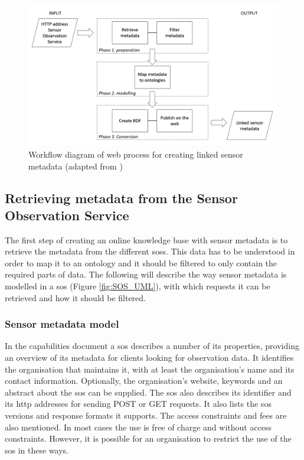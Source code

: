 \begin{figure}
	\centering
	\includegraphics[width=1\linewidth]{UML/wps1workflow.PNG}
	\caption{Workflow diagram of web process for creating linked sensor metadata (adapted from \cite{LD:Missier})}
	\label{fig:WPS1workflow}
\end{figure}

\subsection{Retrieving metadata from the Sensor Observation Service}
\label{chap:retrieveSOS}

The first step of creating an online knowledge base with sensor metadata is to retrieve the metadata from the different \aclp{sos}. This data has to be understood in order to map it to an ontology and it should be filtered to only contain the required parts of data. The following will describe the way sensor metadata is modelled in a \ac{sos} (Figure \ref{fig:SOS_UML}), with which requests it can be retrieved and how it should be filtered. 

\subsubsection{Sensor metadata model}
In the capabilities document a \ac{sos} describes a number of its properties, providing an overview of its metadata for clients looking for observation data. It identifies the organisation that maintains it, with at least the organisation's name and its contact information. Optionally, the organisation's website, keywords and an abstract about the \ac{sos} can be supplied. The \ac{sos} also describes its identifier and its \ac{http} addresses for sending POST or GET requests. It also lists the \ac{sos} versions and response formats it supports. The access constraints and fees are also mentioned. In most cases the use is free of charge and without access constraints. However, it is possible for an organisation to restrict the use of the \ac{sos} in these ways.  

